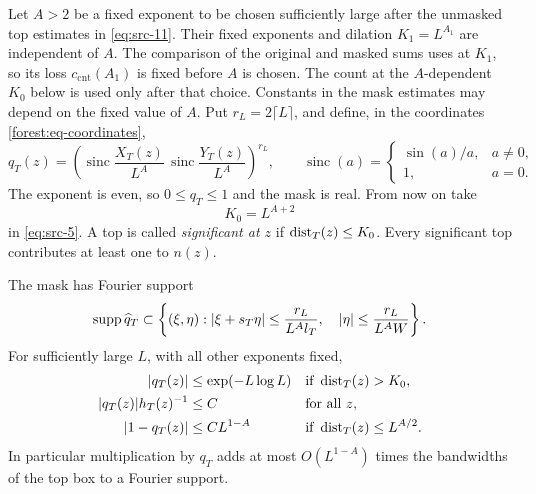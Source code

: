 Let \(A>2\) be a fixed exponent to be chosen sufficiently large
after the unmasked top estimates in \eqref{eq:src-11}. Their fixed
exponents and dilation \(K_1=L^{A_1}\) are independent of \(A\).
The comparison of the original and masked sums uses
 at \(K_1\), so its loss
\(c_{\mathrm{cnt}}(A_1)\) is fixed before \(A\) is chosen.
The count at the \(A\)-dependent \(K_0\) below is used only after
that choice. Constants in the mask estimates may depend on the fixed
value of \(A\).
Put \(r_L=2\lceil L\rceil\), and define, in the coordinates
\eqref{forest:eq-coordinates},
\begin{equation}\label{eq:src-8}
 q_T(z)=\left(
       \operatorname{sinc}\frac{X_T(z)}{L^A}\,
       \operatorname{sinc}\frac{Y_T(z)}{L^A}
       \right)^{r_L},\qquad
 \operatorname{sinc}(a)=
 \begin{cases}\sin(a)/a,&a\ne0,\\1,&a=0.\end{cases}
\end{equation}
The exponent is even, so \(0\le q_T\le1\) and the mask is real.
From now on take
\[
 K_0=L^{A+2}
\]
in \eqref{eq:src-5}. A top is called \emph{significant at \(z\)}
if \(\operatorname{dist}_T(z)\le K_0\). Every significant top contributes at
least one to \(n(z)\).

\begin{lemma}\label{forest:lem-mask}
The mask has Fourier support
\begin{equation}\label{forest:eq-mask-spectrum}
 \operatorname{supp}\widehat q_T\subset
 \left\{(\xi,\eta):
       |\xi+s_T\eta|\le\frac{r_L}{L^A l_T},\quad
       |\eta|\le\frac{r_L}{L^A W}\right\}.
\end{equation}
For sufficiently large \(L\), with all other exponents fixed,
\begin{align}
 |q_T(z)|&\le \exp(-L\log L)
       &&\text{if }\operatorname{dist}_T(z)>K_0,
       \label{forest:eq-mask-outside}\\
 |q_T(z)|h_T(z)^{-1}&\le C
       &&\text{for all }z,
       \label{forest:eq-mask-weight}\\
 |1-q_T(z)|&\le C L^{1-A}
       &&\text{if }\operatorname{dist}_T(z)\le L^{A/2}.
       \label{forest:eq-mask-inside}
\end{align}
In particular multiplication by \(q_T\) adds at most
\(O(L^{1-A})\) times the bandwidths of the top box to a Fourier
support.
\end{lemma}


